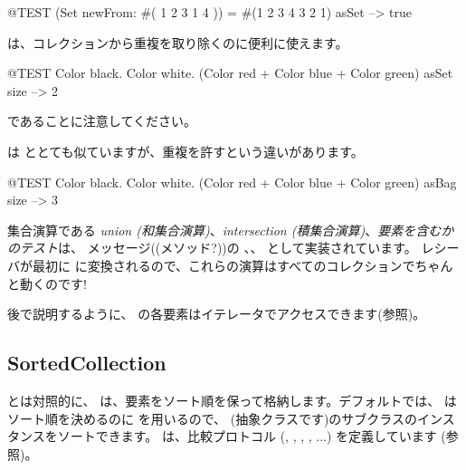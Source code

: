 \documentclass[a4paper,10pt,twoside]{book}
\begin{document}
\begin{code}{@TEST}
(Set newFrom: #( 1 2 3 1 4 )) = #(1 2 3 4 3 2 1) asSet --> true
\end{code}

 は、コレクションから重複を取り除くのに便利に使えます。
\begin{code}{@TEST}
{ Color black. Color white. (Color red + Color blue + Color green) } asSet size --> 2
\end{code}
\noindent
{} であることに注意してください。

 は  ととても似ていますが、重複を許すという違いがあります。
\begin{code}{@TEST}
{ Color black. Color white. (Color red + Color blue + Color green) } asBag size --> 3
\end{code}

集合演算である \emph{union (和集合演算)}、\emph{intersection (積集合演算)}、\emph{要素を含むかのテスト}は、 メッセージ((メソッド?))の 、、 として実装されています。
レシーバが最初に  に変換されるので、これらの演算はすべてのコレクションでちゃんと動くのです!


後で説明するように、 の各要素はイテレータでアクセスできます(参照)。

\subsection{SortedCollection}
 とは対照的に、 は、要素をソート順を保って格納します。デフォルトでは、 はソート順を決めるのに  を用いるので、 (抽象クラスです)のサブクラスのインスタンスをソートできます。 は、比較プロトコル (, , , , ...) を定義しています
(参照)。
\end{document}
